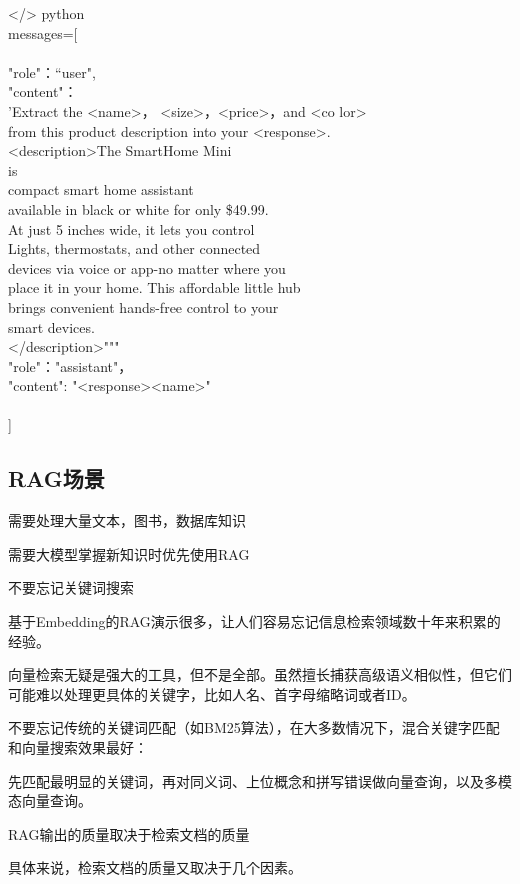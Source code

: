 \documentclass[12pt]{book}
\begin{document}
</> python\\
messages=[\\
{\\
	"role"：“user",\\
	"content"：\\
	'Extract the <name>， <size>，<price>，and <co lor>\\
	from this product description into your <response>.\\
	<description>The SmartHome Mini\\
	is\\
	compact smart home assistant\\
	available in black or white for only \$49.99.\\
	At just 5 inches wide, it lets you control\\
	Lights, thermostats, and other connected\\
	devices via voice or app-no matter where you\\
	place it in your home. This affordable little hub\\
	brings convenient hands-free control to your\\
	smart devices.\\
	</description>"""\\
	"role"："assistant"，\\
	"content": "<response><name>"\\
}\\
]\\


\subsection{RAG场景}
需要处理大量文本，图书，数据库知识

需要大模型掌握新知识时优先使用RAG

不要忘记关键词搜索

基于Embedding的RAG演示很多，让人们容易忘记信息检索领域数十年来积累的经验。

向量检索无疑是强大的工具，但不是全部。虽然擅长捕获高级语义相似性，但它们可能难以处理更具体的关键字，比如人名、首字母缩略词或者ID。

不要忘记传统的关键词匹配（如BM25算法），在大多数情况下，混合关键字匹配和向量搜索效果最好：

先匹配最明显的关键词，再对同义词、上位概念和拼写错误做向量查询，以及多模态向量查询。

RAG输出的质量取决于检索文档的质量

具体来说，检索文档的质量又取决于几个因素。
\end{document}
